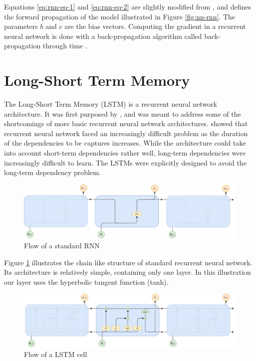 Equations \ref{eq:rnn-eq-1} and \ref{eq:rnn-eq-2} are slightly modified from \citep{goodfellow2016deeplearning}, and defines the forward propagation of the model illustrated in Figure \ref{fig:nn-rnn}. The parameters \(b\) and \(c\) are the bias vectors. Computing the gradient in a recurrent neural network is done with a back-propagation algorithm called back-propagation through time \citep{werbos1990backpropagation}. 


\section{Long-Short Term Memory}
The Long-Short Term Memory (LSTM) is a recurrent neural network architecture. It was first purposed by \citep{hochreiter1997long}, and was meant to address some of the shortcomings of more basic recurrent neural network architectures. \citep{bengio1994learning} showed that recurrent neural network faced an increasingly difficult problem as the duration of the dependencies to be captures increases. While the architecture could take into account short-term dependencies rather well, long-term dependencies were increasingly difficult to learn. The LSTMs were explicitly designed to avoid the long-term dependency problem. 

\begin{figure}[ht]
    \centering
    \includegraphics[width=1\textwidth]{fig/related_work/rnn_flow.pdf}
    \caption{Flow of a standard RNN}
    \label{fig:nn-rnn-flow}
\end{figure}

Figure \ref{fig:nn-rnn-flow} illustrates the chain like structure of standard recurrent neural network. Its architecture is relatively simple, containing only one layer. In this illustration our layer uses the hyperbolic tangent function (tanh).

\begin{figure}[ht]
    \centering
    \includegraphics[width=1\textwidth]{fig/related_work/lstm_flow.pdf}
    \caption{Flow of a LSTM cell}
    \label{fig:nn-lstm-flow}
\end{figure}

